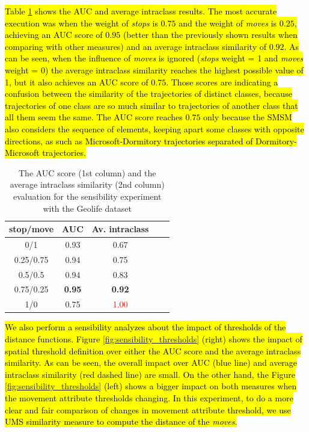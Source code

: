 \documentclass[12pt]{article}
\begin{document}
\hl{Table {\ref{tab:sensibility_stopmove}} shows the AUC and average intraclass results. The most accurate execution was when the weight of \emph{stops} is $0.75$ and the weight of \emph{moves} is $0.25$, achieving an AUC score of $0.95$ (better than the previously shown results when comparing with other measures) and an average intraclass similarity of $0.92$. As can be seen, when the influence of \emph{moves} is ignored (\emph{stops} weight = 1 and \emph{moves} weight = 0) the average intraclass similarity reaches the highest possible value of 1, but it also achieves an AUC score of $0.75$. Those scores are indicating a confusion between the similarity of the trajectories of distinct classes, because trajectories of one class are so much similar to trajectories of another class that all them seem the same. The AUC score reaches $0.75$ only because the SMSM also considers the sequence of elements, keeping apart some classes with opposite directions, as such as Microsoft-Dormitory trajectories separated of Dormitory-Microsoft trajectories.}

\begin{table}[ht!]
  \scriptsize
  \centering
  \begin{tabular}{|c|c|c|c|c|}
  	\hline
stop/move & AUC & Av. intraclass\\
  	\hline
0/1 &0.93 & 0.67\\
0.25/0.75 & 0.94 & 0.75\\
0.5/0.5 & 0.94 & 0.83\\
0.75/0.25 & \textbf{0.95} & \textbf{0.92}\\
1/0 & 0.75 & \textcolor{red}{1.00} \\
    \hline
  \end{tabular}
  \caption{The AUC score (1st column) and the average intraclass similarity (2nd column) evaluation for the sensibility experiment with the Geolife dataset}
  \label{tab:sensibility_stopmove}
\end{table}

\hl{We also perform a sensibility analyzes about the impact of thresholds of the distance functions. Figure {\ref{fig:sensibility_thresholds}} (right) shows the impact of spatial threshold definition over either the AUC score and the average intraclass similarity. As can be seen, the overall impact over AUC (blue line) and average intraclass similarity (red dashed line) are small. On the other hand, the Figure {\ref{fig:sensibility_thresholds}} (left) shows a bigger impact on both measures when the movement attribute thresholds changing. In this experiment, to do a more clear and fair comparison of changes in movement attribute threshold, we use UMS similarity measure to compute the distance of the \emph{moves}.}
\end{document}
